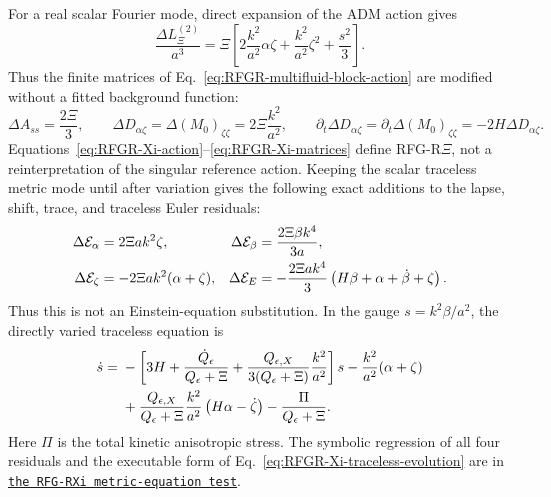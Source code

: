 \documentclass[11pt,a4paper]{article}
\newcommand{\RFGRepoURL}{https://github.com/MartinPetrasek123/MartinPetrasek123}
\newcommand{\RFGRepoNamed}[2]{\href{\RFGRepoURL/blob/main/r-universe-complete-chain/rfg-r-completion/r\_universe\_completion/#1}{\texttt{#2}}}
\begin{document}
For a real scalar Fourier mode, direct expansion of the ADM action gives
\begin{equation}
 \frac{\Delta L_{\Xi}^{(2)}}{a^3}
 =\Xi\left[
 2\frac{k^2}{a^2}\alpha\zeta
 +\frac{k^2}{a^2}\zeta^2+\frac{s^2}{3}\right].
 \label{eq:RFGR-Xi-quadratic}
\end{equation}
Thus the finite matrices of Eq.~\eqref{eq:RFGR-multifluid-block-action} are
modified without a fitted background function:
\begin{equation}
 \Delta A_{ss}=\frac{2\Xi}{3},\qquad
 \Delta D_{\alpha\zeta}=
 \Delta(M_0)_{\zeta\zeta}=2\Xi\frac{k^2}{a^2},
 \qquad
 \partial_t\Delta D_{\alpha\zeta}
 =\partial_t\Delta(M_0)_{\zeta\zeta}
 =-2H\Delta D_{\alpha\zeta}.
 \label{eq:RFGR-Xi-matrices}
\end{equation}
Equations~\eqref{eq:RFGR-Xi-action}--\eqref{eq:RFGR-Xi-matrices} define
RFG-R\(\Xi\), not a reinterpretation of the singular reference action.
Keeping the scalar traceless metric mode until after variation gives the
following exact additions to the lapse, shift, trace, and traceless Euler
residuals:
\begin{align}
 \Delta\mathcal E_\alpha&=2\Xi ak^2\zeta,&
 \Delta\mathcal E_\beta&=\frac{2\Xi\beta k^4}{3a}, \notag\\
 \Delta\mathcal E_\zeta&=-2\Xi ak^2(\alpha+\zeta),&
 \Delta\mathcal E_E&=-\frac{2\Xi ak^4}{3}
 \left(H\beta+\alpha+\dot\beta+\zeta\right).
 \label{eq:RFGR-Xi-metric-residuals}
\end{align}
Thus this is not an Einstein-equation substitution. In the gauge
\(s=k^2\beta/a^2\), the directly varied traceless equation is
\begin{align}
 \dot s={}&-\left[3H+\frac{\dot Q_\epsilon}{Q_\epsilon+\Xi}
 +\frac{Q_{\epsilon,X}}{3(Q_\epsilon+\Xi)}\frac{k^2}{a^2}\right]s
 -\frac{k^2}{a^2}(\alpha+\zeta) \notag\\
 &+\frac{Q_{\epsilon,X}}{Q_\epsilon+\Xi}\frac{k^2}{a^2}
 \left(H\alpha-\dot\zeta\right)-\frac{\Pi}{Q_\epsilon+\Xi}.
 \label{eq:RFGR-Xi-traceless-evolution}
\end{align}
Here \(\Pi\) is the total kinetic anisotropic stress. The symbolic regression
of all four residuals and the executable form of
Eq.~\eqref{eq:RFGR-Xi-traceless-evolution} are in
\RFGRepoNamed{scripts/validate\_rfg\_xi\_metric\_equations.py}{the RFG-RXi metric-equation test}.
\end{document}
